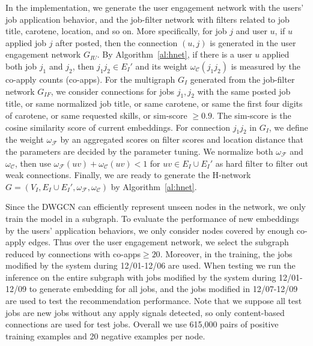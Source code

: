 \documentclass[manuscript,screen,review]{acmart}
\newcommand\Fcal{\mathcal{F}}
\newcommand{\Ccal}{\mathcal{C}}
\begin{document}
In the implementation, we generate the user engagement network with the users' job application behavior, and the job-filter network with filters related to job title, carotene, location, and so on. More specifically, for job $j$ and user $u$, if $u$ applied job $j$ after posted, then the connection $(u,j)$ is generated in the user engagement network $G_{IU}$. By Algorithm~\ref{al:hnet}, if there is a user $u$ applied both job $j_1$ and $j_2$, then $j_1j_2\in E_I'$ and its weight $\omega_{\Ccal}(j_1j_2)$ is measured by the co-apply counts (co-apps).  For the multigraph $G_I$ generated from the job-filter network $G_{IF}$, we consider connections for jobs $j_1,j_2$ with the same posted job title, or same normalized job title, or same carotene, or same the first four digits of carotene, or same requested skills, or sim-score $\geq0.9$. The sim-score is the cosine similarity score of current embeddings. For connection $j_1j_2$ in $G_I$, we define the weight $\omega_{\Fcal}$ by an aggregated scores on filter scores and location distance that the parameters are decided by the parameter tuning.  We normalize both $\omega_{\Fcal}$ and $\omega_{\Ccal}$, then use $\omega_{\Fcal}(uv)+\omega_{\Ccal}(uv)<1$ for $uv\in E_I\cup E_I'$ as hard filter to filter out weak connections.
Finally, we are ready to generate the H-network $G=(V_I,E_I\cup E_I',\omega_{\mathcal{F}},\omega_{\mathcal{C}})$ by Algorithm~\ref{al:hnet}.

Since the DWGCN can efficiently represent unseen nodes in the network, we only train the model in a subgraph. To evaluate the performance of new embeddings by the users' application behaviors, we only consider nodes covered by enough co-apply edges. Thus    
over the user engagement network, we select the subgraph reduced by connections with co-apps$\geq20$.
Moreover, in the training, the jobs modified by the system during 12/01-12/06 are used. When testing we run the inference on the entire subgraph with jobs modified by the system during 12/01-12/09 to generate embedding for all jobs, and the jobs modified in 12/07-12/09 are used to test the recommendation performance. Note that we suppose all test jobs are new jobs without any apply signals detected, so only content-based connections are used for test jobs.
Overall we use 615,000 pairs of positive training examples and 20 negative examples per node. 
\end{document}
